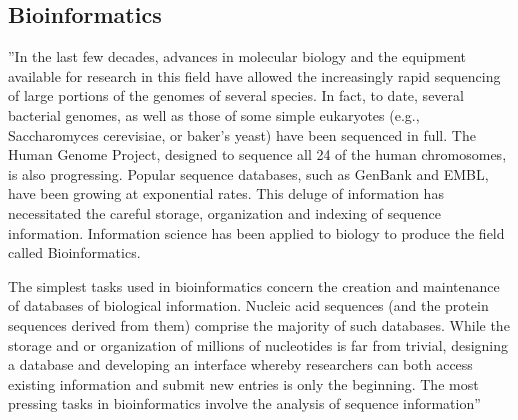 \subsection{Bioinformatics}
\label{sec:bioinformatics}

''In the last few decades, advances in molecular biology and the equipment available for research in this field have allowed the increasingly rapid sequencing of large portions of the genomes of several species.
In fact, to date, several bacterial genomes, as well as those of some simple eukaryotes (e.g., Saccharomyces cerevisiae, or baker's yeast) have been sequenced in full.
The Human Genome Project, designed to sequence all 24 of the human chromosomes, is also progressing. Popular sequence databases, such as GenBank and EMBL, have been growing at exponential rates.
This deluge of information has necessitated the careful storage, organization and indexing of sequence information. Information science has been applied to biology to produce the field called Bioinformatics.


The simplest tasks used in bioinformatics concern the creation and maintenance of databases of biological information.
Nucleic acid sequences (and the protein sequences derived from them) comprise the majority of such databases. While the storage and or organization of millions of nucleotides is far from trivial,
designing a database and developing an interface whereby researchers can both access existing information and submit new entries is only the beginning.
The most pressing tasks in bioinformatics involve the analysis of sequence information''~\cite{Biology}


